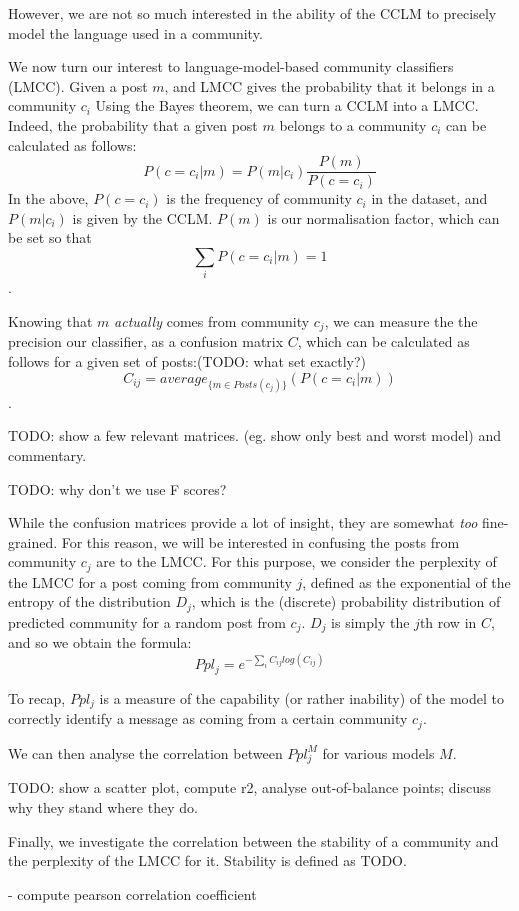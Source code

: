 \documentclass[11pt,a4paper]{article}
\begin{document}
However, we are not so much interested in the ability of the CCLM to
precisely model the language used in a community.

We now turn our interest to language-model-based community classifiers
(LMCC). Given a post $m$, and LMCC gives the probability that it
belongs in a community $c_i$ Using the Bayes theorem, we can turn a
CCLM into a LMCC. Indeed, the probability that a given post $m$
belongs to a community $c_i$ can be calculated as follows:
\[P(c=c_i | m) = P(m | c_i)\frac {P(m)} {P(c=c_i)}\]
In the above,
$P(c=c_i)$ is the frequency of community $c_i$ in the dataset, and
$P(m | c_i)$ is given by the CCLM. $P(m)$ is our normalisation factor, which can be set so that
\[\sum_i P(c=c_i | m) = 1\].

Knowing that $m$ \emph{actually} comes from community $c_j$, we can
measure the the precision our classifier, as a confusion matrix $C$,
which can be calculated as follows for a given set of posts:(TODO: what set exactly?)
\[C_{ij} = average_{\{m ∈ Posts(c_j)\}}(P(c=c_i | m))\].

TODO: show a few relevant matrices. (eg. show only best and worst model) and commentary.

TODO: why don't we use F scores?

While the confusion matrices provide a lot of insight, they are
somewhat \emph{too} fine-grained. For this reason, we will be
interested in confusing the posts from community $c_j$ are to the
LMCC. For this purpose, we consider the perplexity of the LMCC for a
post coming from community $j$, defined as the exponential of the
entropy of the distribution \(D_j\), which is the (discrete)
probability distribution of predicted community for a random post from
$c_j$. $D_j$ is simply the $j$th row in \(C\), and so we obtain the formula:
\[Ppl_j = e^{-\sum_i C_{ij} log(C_{ij})}\]

To recap, \(Ppl_j\) is a measure of the capability (or rather
inability) of the model to correctly identify a message as coming from
a certain community $c_j$. 

We can then analyse the correlation between \(Ppl^M_j\) for various models $M$.

TODO: show a scatter plot, compute r2, analyse out-of-balance points; discuss why they stand where they do.


Finally, we investigate the correlation between the stability of a
community and the perplexity of the LMCC for it. Stability is defined as TODO.

- compute pearson correlation coefficient
\end{document}

